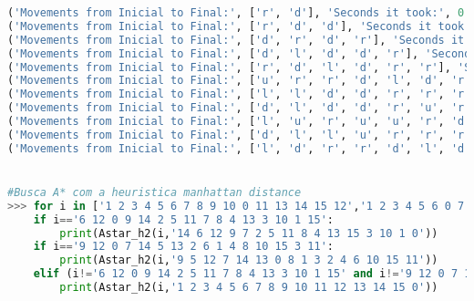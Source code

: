 \documentclass{article}
\begin{document}
\begin{lstlisting}[language = Python]
('Movements from Inicial to Final:', ['r', 'd'], 'Seconds it took:', 0.0004944801330566406, 'Space used:', 6)
('Movements from Inicial to Final:', ['r', 'd', 'd'], 'Seconds it took:', 0.0004954338073730469, 'Space used:', 12)
('Movements from Inicial to Final:', ['d', 'r', 'd', 'r'], 'Seconds it took:', 0.002529621124267578, 'Space used:', 25)
('Movements from Inicial to Final:', ['d', 'l', 'd', 'd', 'r'], 'Seconds it took:', 0.001981973648071289, 'Space used:', 28)
('Movements from Inicial to Final:', ['r', 'd', 'l', 'd', 'r', 'r'], 'Seconds it took:', 0.005024909973144531, 'Space used:', 39)
('Movements from Inicial to Final:', ['u', 'r', 'r', 'd', 'l', 'd', 'r'], 'Seconds it took:', 0.00942373275756836, 'Space used:', 63)
('Movements from Inicial to Final:', ['l', 'l', 'd', 'd', 'r', 'r', 'r', 'd'], 'Seconds it took:', 0.00396728515625, 'Space used:', 43)
('Movements from Inicial to Final:', ['d', 'l', 'd', 'd', 'r', 'u', 'r', 'd', 'r'], 'Seconds it took:', 0.020829439163208008, 'Space used:', 130)
('Movements from Inicial to Final:', ['l', 'u', 'r', 'u', 'u', 'r', 'd', 'd', 'r', 'd'], 'Seconds it took:', 0.046123504638671875, 'Space used:', 214)
('Movements from Inicial to Final:', ['d', 'l', 'l', 'u', 'r', 'r', 'r', 'u', 'l', 'd', 'd', 'r'], 'Seconds it took:', 0.4733090400695801, 'Space used:', 595)
('Movements from Inicial to Final:', ['l', 'd', 'r', 'r', 'd', 'l', 'd', 'l', 'l', 'u', 'r', 'r', 'u'], 'Seconds it took:', 0.23460650444030762, 'Space used:', 456)


#Busca A* com a heuristica manhattan distance
>>> for i in ['1 2 3 4 5 6 7 8 9 10 0 11 13 14 15 12','1 2 3 4 5 6 0 7 9 10 11 8 13 14 15 12','1 2 3 4 5 0 7 8 9 6 10 12 13 14 11 15','1 2 3 0 5 6 8 4 9 10 7 12 13 14 11 15','1 2 3 4 5 0 6 8 9 11 7 12 13 10 14 15','1 2 3 4 5 10 6 7 9 0 12 8 13 14 11 15','6 12 0 9 14 2 5 11 7 8 4 13 3 10 1 15','1 0 3 4 6 2 7 8 5 14 10 12 9 13 11 15','1 6 2 4 5 10 3 8 13 9 7 11 14 0 15 12','1 2 3 4 5 6 8 12 13 9 0 7 14 11 10 15','9 12 0 7 14 5 13 2 6 1 4 8 10 15 3 11']:
	if i=='6 12 0 9 14 2 5 11 7 8 4 13 3 10 1 15':
		print(Astar_h2(i,'14 6 12 9 7 2 5 11 8 4 13 15 3 10 1 0'))
	if i=='9 12 0 7 14 5 13 2 6 1 4 8 10 15 3 11':
		print(Astar_h2(i,'9 5 12 7 14 13 0 8 1 3 2 4 6 10 15 11'))
	elif (i!='6 12 0 9 14 2 5 11 7 8 4 13 3 10 1 15' and i!='9 12 0 7 14 5 13 2 6 1 4 8 10 15 3 11'):
		print(Astar_h2(i,'1 2 3 4 5 6 7 8 9 10 11 12 13 14 15 0'))


\end{lstlisting}
\end{document}
